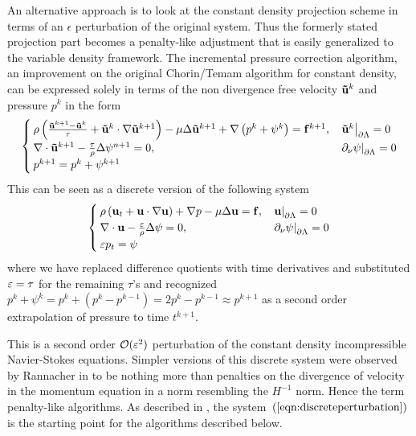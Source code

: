 \documentclass[letterpaper]{erdc}
\begin{document}
An alternative approach is to look at the constant density projection scheme in terms of an $\epsilon$ perturbation of the original system. Thus the formerly stated projection part becomes a penalty-like adjustment that is easily generalized to the variable density framework.  The incremental pressure correction algorithm, an improvement on the original Chorin/Temam algorithm for constant density, can be expressed solely in terms of the non divergence free velocity $\mathbf{\tilde{u}}^{k}$ and pressure $p^{k}$ in the form
\begin{equation}
  \begin{cases}
    \rho\left(\frac{\mathbf{\tilde{u}}^{k+1} - \mathbf{\tilde{u}}^{k}}{\tau} + \mathbf{\tilde{u}}^{k}\cdot\nabla\mathbf{\tilde{u}}^{k+1} \right) - \mu\Delta\mathbf{\tilde{u}}^{k+1} + \nabla\left(p^{k} + \psi^{k}  \right) = \mathbf{f}^{k+1}, & \left.\mathbf{\tilde{u}}^{k}\right|_{\partial\Lambda} = 0\\
    \nabla\cdot\mathbf{\tilde{u}}^{k+1} - \frac{\tau}{\rho}\Delta\psi^{n+1}=0, &\left.\partial_\nu\psi\right|_{\partial\Lambda} = 0\\
    p^{k+1} = p^{k} + \psi^{k+1}
  \end{cases}
\end{equation}
This can be seen as a discrete version of the following system 
\begin{equation}\label{eqn:discreteperturbation}
  \begin{cases}
    \rho\left(\textbf{u}_t + \textbf{u}\cdot\nabla\textbf{u}  \right) + \nabla p -\mu\Delta\textbf{u} = \mathbf{f}, & \left.\textbf{u}\right|_{\partial\Lambda} = 0\\
    \nabla\cdot\textbf{u} - \frac{\varepsilon}{\rho}\Delta \psi = 0,& \left.\partial_\nu \psi\right|_{\partial\Lambda} = 0\\
    \varepsilon p_t = \psi
  \end{cases}
\end{equation}
where we have replaced difference quotients with time derivatives and substituted $\varepsilon = \tau$ for the remaining $\tau$'s and recognized $p^{k} + \psi^{k} = p^{k} + \left( p^{k} - p^{k-1} \right) = 2p^{k} - p^{k-1} \approx p^{k+1}$ as a second order extrapolation of pressure to time $t^{k+1}$.

This is a second order $\mathcal{O}(\varepsilon^2)$ perturbation of the constant density incompressible Navier-Stokes equations.  Simpler versions of this discrete system were observed by Rannacher in \cite{rannacher1992chorin} to be nothing more than penalties on the divergence of velocity in the momentum equation in a norm resembling the $H^{-1}$ norm.  Hence the term penalty-like algorithms.  As described in \cite{guermond2009splitting}, the system~$\left(\ref{eqn:discreteperturbation}\right)$ is the starting point for the algorithms described below.
\end{document}
